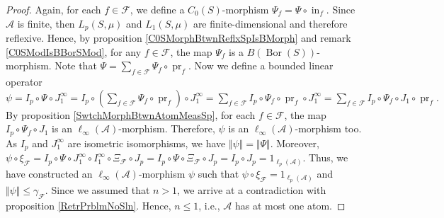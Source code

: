 \documentclass[12pt]{article}
\begin{document}
\begin{proof}
    Again, for each $f\in\mathcal{F}$, we define 
    a $C_0(S)$-morphism $\Psi_f=\Psi\circ \operatorname{in}_f$. 
    Since $\mathcal{A}$ is finite, then $L_p(S,\mu)$ and $L_1(S,\mu)$ are
    finite-dimensional and therefore reflexive. Hence, by 
    proposition \ref{C0SMorphBtwnReflxSpIsBMorph} and 
    remark \ref{C0SModIsBBorSMod}, for any $f\in\mathcal{F}$, the
    map $\Psi_f$ is a $B(\operatorname{Bor}(S))$-morphism. Note that
    $
        \Psi=\sum_{f\in\mathcal{F}} \Psi_f\circ\operatorname{pr}_f.
    $
    Now we define a bounded linear operator
    $
        \psi
        =I_p\circ\Psi\circ J_1^\infty
        =I_p\circ\left(
            \sum_{f\in\mathcal{F}} \Psi_f\circ \operatorname{pr}_f
        \right)\circ J_1^\infty 
        =\sum_{f\in\mathcal{F}} 
            I_p\circ\Psi_f\circ\operatorname{pr}_f\circ J_1^\infty 
        =\sum_{f\in\mathcal{F}} 
            I_p\circ\Psi_f\circ J_1\circ\operatorname{pr}_f.
    $
    By proposition \ref{SwtchMorphBtwnAtomMeasSp}, for each $f\in \mathcal{F}$, 
    the map $I_p\circ \Psi_f\circ J_1$ is 
    an $\ell_\infty(\mathcal{A})$-morphism. Therefore, $\psi$ is 
    an $\ell_\infty(\mathcal{A})$-morphism too. As $I_p$ and $J_1^{\infty}$ are
    isometric isomorphisms, we have $\Vert\psi\Vert=\Vert\Psi\Vert$. Moreover,
    $
        \psi\circ\xi_\mathcal{F}
        = I_p\circ\Psi\circ J_1^{\infty}\circ 
            I_1^{\infty}\circ \Xi_{\mathcal{F}}\circ J_p
        = I_p\circ\Psi\circ \Xi_{\mathcal{F}}\circ J_p
        = I_p\circ J_p
        = 1_{\ell_p(\mathcal{A})}.
    $
    Thus, we have constructed an $\ell_\infty(\mathcal{A})$-morphism $\psi$
    such that $\psi\circ\xi_{\mathcal{F}}=1_{\ell_p(\mathcal{A})}$ 
    and $\Vert \psi\Vert\leq\gamma_{\mathcal{F}}$. Since we assumed that $n>1$,
    we arrive at a contradiction with proposition \ref{RetrPrblmNoSln}. 
    Hence, $n\leq 1$, i.e., $\mathcal{A}$ has at most one atom.
\end{proof}
\end{document}

